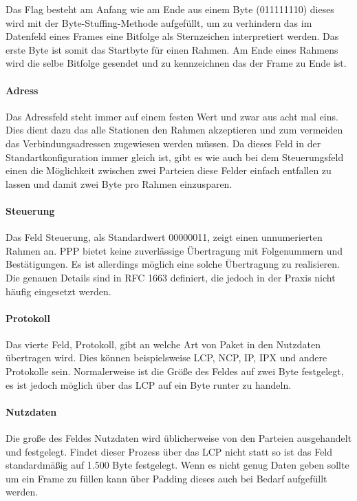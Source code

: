 \documentclass[12pt, a4paper, ngerman]{article}
\begin{document}
Das Flag besteht am Anfang wie am Ende aus einem Byte (011111110) dieses wird mit der Byte-Stuffing-Methode aufgefüllt, um zu verhindern das im Datenfeld eines Frames eine Bitfolge als Sternzeichen interpretiert werden. Das erste Byte ist somit das Startbyte für einen Rahmen. Am Ende eines Rahmens wird die selbe Bitfolge gesendet und zu kennzeichnen das der Frame zu Ende ist.


\paragraph{Adress}

Das Adressfeld steht immer auf einem festen Wert und zwar aus acht mal eins. Dies dient dazu das alle Stationen den Rahmen akzeptieren und zum vermeiden das Verbindungsadressen zugewiesen werden müssen. Da dieses Feld in der Standartkonfiguration immer gleich ist, gibt es wie auch bei dem Steuerungsfeld einen die Möglichkeit zwischen zwei Parteien diese Felder einfach entfallen zu lassen und damit zwei Byte pro Rahmen einzusparen.


\paragraph{Steuerung}

Das Feld Steuerung, als Standardwert 00000011, zeigt einen unnumerierten Rahmen an. PPP bietet keine zuverlässige Übertragung mit Folgenummern und Bestätigungen. Es ist allerdings möglich eine solche Übertragung zu realisieren. Die genauen Details sind in RFC 1663 definiert, die jedoch in der Praxis nicht häufig eingesetzt werden.


\paragraph{Protokoll}

Das vierte Feld, Protokoll, gibt an welche Art von Paket in den Nutzdaten übertragen wird. Dies können beispielsweise LCP, NCP, IP, IPX und andere Protokolle sein. Normalerweise ist die Größe des Feldes auf zwei Byte festgelegt, es ist jedoch möglich über das LCP auf ein Byte runter zu handeln.


\paragraph{Nutzdaten}

Die große des Feldes Nutzdaten wird üblicherweise von den Parteien ausgehandelt und festgelegt. Findet dieser Prozess über das LCP nicht statt so ist das Feld standardmäßig auf 1.500 Byte festgelegt.
Wenn es nicht genug Daten geben sollte um ein Frame zu füllen kann über Padding dieses auch bei Bedarf aufgefüllt werden.
\end{document}
